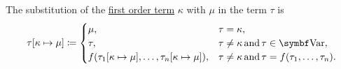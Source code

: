 \begin{definition}
\begin{DefEnum}
     The substitution of the \hyperref[def:first_order_syntax/term]{first order term} \( \kappa \) with \( \mu \) in the term \( \tau \) is
    \begin{equation}\label{eq:def:first_order_substitution/term_in_term}
      \tau[\kappa \mapsto \mu] \coloneqq \begin{cases}
        \mu,                                                               &\tau = \kappa, \\
        \tau,                                                              &\tau \neq \kappa \T{and} \tau \in \Bold{Var}, \\
        f(\tau_1[\kappa \mapsto \mu], \ldots, \tau_n[\kappa \mapsto \mu]), &\tau \neq \kappa \T{and} \tau = f(\tau_1, \ldots, \tau_n).
      \end{cases}
    \end{equation}


\end{DefEnum}
\end{definition}

